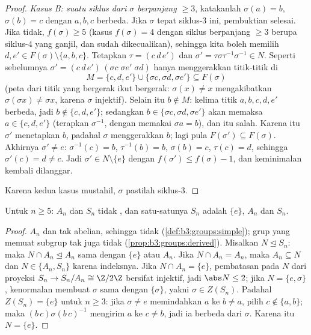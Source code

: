 \begin{proof}
\emph{Kasus B: suatu siklus dari $\sigma$ berpanjang $\geq 3$}, katakanlah
$\sigma(a) = b$, $\sigma(b) = c$ dengan $a, b, c$ berbeda. Jika
$\sigma$ tepat siklus-$3$ ini, pembuktian selesai. Jika tidak,
$f(\sigma) \geq 5$ (kasus $f(\sigma) = 4$ dengan siklus berpanjang $\geq3$
berupa siklus-$4$ yang ganjil, dan sudah dikecualikan), sehingga kita boleh memilih $d, e' \in
F(\sigma) \setminus \{a, b, c\}$. Tetapkan $\tau = (c\,d\,e')$ dan
$\sigma' = \tau\sigma\tau^{-1}\sigma^{-1} \in N$. Seperti sebelumnya
$\sigma' = (c\,d\,e')\,(\sigma c\;\sigma e'\;\sigma d)$ hanya menggerakkan
titik-titik di
\[
M = \{c, d, e'\} \cup \{\sigma c, \sigma d, \sigma e'\}
\subseteq F(\sigma)
\]
(peta dari titik yang bergerak ikut bergerak: $\sigma(x) \ne x$ mengakibatkan
$\sigma(\sigma x) \neq \sigma x$, karena $\sigma$ injektif). Selain itu
$b \notin M$: kelima titik $a, b, c, d, e'$ berbeda, jadi $b
\notin \{c, d, e'\}$; sedangkan $b \in \{\sigma c, \sigma d, \sigma
e'\}$ akan memaksa $a \in \{c, d, e'\}$ (terapkan $\sigma^{-1}$, dengan memakai
$\sigma a = b$), dan itu salah. Karena itu $\sigma'$ menetapkan $b$, padahal
$\sigma$ menggerakkan $b$; lagi pula
$F(\sigma') \subseteq F(\sigma)$. Akhirnya $\sigma' \neq e$:
$\sigma^{-1}(c) = b$, $\tau^{-1}(b) = b$, $\sigma(b) = c$,
$\tau(c) = d$, sehingga $\sigma'(c) = d \neq c$. Jadi $\sigma' \in N
\setminus \{e\}$ dengan $f(\sigma') \leq f(\sigma) - 1$,
dan keminimalan kembali dilanggar.

Karena kedua kasus mustahil, $\sigma$ pastilah siklus-$3$.
\end{proof}

\begin{corollary}\label{cor:b3:groups:snnotsolvable}
Untuk $n \geq 5$: $A_n$ dan $S_n$ tidak , dan satu-satunya
 $S_n$ adalah $\{e\}$, $A_n$ dan $S_n$.
\end{corollary}

\begin{proof}
$A_n$  dan tak abelian, sehingga tidak 
(\cref{def:b3:groups:simple}); grup yang memuat subgrup tak
 juga tidak  (\cref{prop:b3:groups:derived}). Misalkan $N
\trianglelefteq S_n$: maka $N \cap A_n \trianglelefteq A_n$ sama dengan
$\{e\}$ atau $A_n$. Jika $N \cap A_n = A_n$, maka $A_n \subseteq N$
dan $N \in \{A_n, S_n\}$ karena indeksnya. Jika $N \cap A_n = \{e\}$,
pembatasan pada $N$ dari proyeksi $S_n \to S_n/A_n \cong
\Z/2\Z$ bersifat injektif, jadi $\abs N \leq 2$; jika $N = \{e, \sigma\}$,
kenormalan membuat  $\sigma$ sama dengan
$\{\sigma\}$, yakni $\sigma \in Z(S_n)$. Padahal $Z(S_n) = \{e\}$ untuk
$n \geq 3$: jika $\sigma \ne e$ memindahkan $a$ ke $b \neq a$, pilih $c
\notin \{a, b\}$; maka $(b\,c)\sigma(b\,c)^{-1}$ mengirim $a$ ke $c
\ne b$, jadi ia berbeda dari $\sigma$. Karena itu $N = \{e\}$.
\end{proof}


